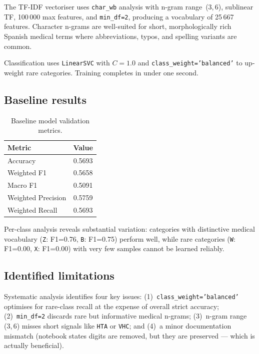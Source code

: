 \documentclass{article}
\begin{document}
The TF-IDF vectoriser uses \texttt{char\_wb} analysis with n-gram range~(3,\,6), sublinear TF, 100\,000 max features, and \texttt{min\_df=2}, producing a vocabulary of 25\,667 features. Character n-grams are well-suited for short, morphologically rich Spanish medical terms where abbreviations, typos, and spelling variants are common.

Classification uses \texttt{LinearSVC} with $C=1.0$ and \texttt{class\_weight='balanced'} to up-weight rare categories. Training completes in under one second.

\subsection{Baseline results}
\label{ssec:baseline_results}

\begin{table}[htb]
\centering
\caption{Baseline model validation metrics.}
\label{tab:baseline}
\begin{tabular}{lc}
\toprule
\textbf{Metric} & \textbf{Value} \\
\midrule
Accuracy & 0.5693 \\
Weighted F1 & 0.5658 \\
Macro F1 & 0.5091 \\
Weighted Precision & 0.5759 \\
Weighted Recall & 0.5693 \\
\bottomrule
\end{tabular}
\end{table}

Per-class analysis reveals substantial variation: categories with distinctive medical vocabulary (\texttt{Z}: F1=0.76, \texttt{B}: F1=0.75) perform well, while rare categories (\texttt{W}: F1=0.00, \texttt{X}: F1=0.00) with very few samples cannot be learned reliably.

\subsection{Identified limitations}
\label{ssec:limitations}

Systematic analysis identifies four key issues: (1)~\texttt{class\_weight='balanced'} optimises for rare-class recall at the expense of overall strict accuracy; (2)~\texttt{min\_df=2} discards rare but informative medical n-grams; (3)~n-gram range (3,\,6) misses short signals like \texttt{HTA} or \texttt{VHC}; and (4)~a minor documentation mismatch (notebook states digits are removed, but they are preserved --- which is actually beneficial).
\end{document}
